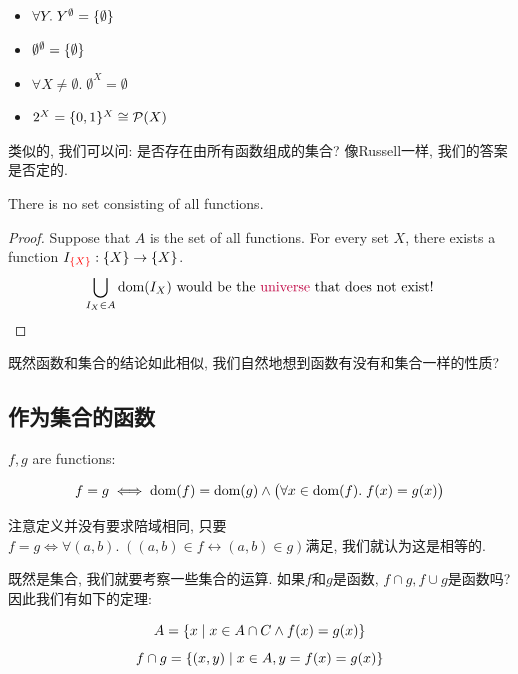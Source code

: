 \begin{eg}
    \begin{itemize}
        \item $\forall Y.\; Y^{\emptyset} = \{\emptyset\}$
        \item $\emptyset^{\emptyset} = \{\emptyset\}$
        \item $\forall X \neq \emptyset.\; \emptyset^{X} =  \emptyset$
        \item $2^{X} = \{0, 1\}^{X} \cong \mathcal{P}(X)$
    \end{itemize}
    
\end{eg}

类似的, 我们可以问: 是否存在由所有函数组成的集合? 像Russell一样, 我们的答案是否定的. 

\begin{theorem}
    There is no set consisting of all functions.
\end{theorem}

\begin{proof}
    Suppose  that $A$ is the set of all functions. 
    For every set $X$, there exists a function $I_{\textcolor{red}{\{X\}}}: \{X\} \to \{X\}$.
    \[
      \bigcup_{I_{X} \in A} \text{dom}(I_{X})
        \text{ would be the \textcolor{purple}{universe} that does not exist!}
    \]
\end{proof}

既然函数和集合的结论如此相似, 我们自然地想到函数有没有和集合一样的性质? 

\subsection{作为集合的函数}

\begin{theorem}
    
      $f, g$  are functions:
    
    \[
      f = g \iff \text{dom}(f) = \text{dom}(g)
        \land \big(\forall x \in \text{dom}(f).\; f(x) = g(x) \big)
    \]
\end{theorem}

注意定义并没有要求陪域相同, 只要$f = g \iff \forall (a, b).\; ((a, b) \in f \leftrightarrow (a, b) \in g)$满足, 我们就认为这是相等的. 

既然是集合, 我们就要考察一些集合的运算. 如果$f$和$g$是函数, $f \cap g, f \cup g$是函数吗? 因此我们有如下的定理: 

\begin{theorem}
    \[
      A = \{x \mid x \in A \cap C \land f(x) = g(x)\}
    \]
    \[
      f \cap g = \{(x, y) \mid x \in A, y = f(x) = g(x)\}
    \]
\end{theorem}

